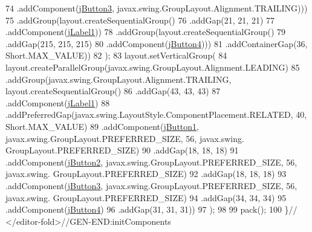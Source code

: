 \begin{DoxyCode}
74                             .addComponent(\mbox{\hyperlink{classinterfacessoguar_1_1encargado_a44f99cceb2a2d736508b0249e1ad447e}{jButton3}}, javax.swing.GroupLayout.Alignment.TRAILING)))
75                     .addGroup(layout.createSequentialGroup()
76                         .addGap(21, 21, 21)
77                         .addComponent(\mbox{\hyperlink{classinterfacessoguar_1_1encargado_a1b1ad6a8d2b52a465c2daf3b4409c9ed}{jLabel1}}))
78                     .addGroup(layout.createSequentialGroup()
79                         .addGap(215, 215, 215)
80                         .addComponent(\mbox{\hyperlink{classinterfacessoguar_1_1encargado_ada21ea49d21b7b6bdd43b2a7c584450d}{jButton4}})))
81                 .addContainerGap(36, Short.MAX\_VALUE))
82         );
83         layout.setVerticalGroup(
84             layout.createParallelGroup(javax.swing.GroupLayout.Alignment.LEADING)
85             .addGroup(javax.swing.GroupLayout.Alignment.TRAILING, layout.createSequentialGroup()
86                 .addGap(43, 43, 43)
87                 .addComponent(\mbox{\hyperlink{classinterfacessoguar_1_1encargado_a1b1ad6a8d2b52a465c2daf3b4409c9ed}{jLabel1}})
88                 .addPreferredGap(javax.swing.LayoutStyle.ComponentPlacement.RELATED, 40, Short.MAX\_VALUE)
89                 .addComponent(\mbox{\hyperlink{classinterfacessoguar_1_1encargado_a5c4a8d1db3281eae3c5b8f19262b20c3}{jButton1}}, javax.swing.GroupLayout.PREFERRED\_SIZE, 56, javax.swing.
      GroupLayout.PREFERRED\_SIZE)
90                 .addGap(18, 18, 18)
91                 .addComponent(\mbox{\hyperlink{classinterfacessoguar_1_1encargado_a1f39888fb096cb2dd2e874f7e05f05b5}{jButton2}}, javax.swing.GroupLayout.PREFERRED\_SIZE, 56, javax.swing.
      GroupLayout.PREFERRED\_SIZE)
92                 .addGap(18, 18, 18)
93                 .addComponent(\mbox{\hyperlink{classinterfacessoguar_1_1encargado_a44f99cceb2a2d736508b0249e1ad447e}{jButton3}}, javax.swing.GroupLayout.PREFERRED\_SIZE, 56, javax.swing.
      GroupLayout.PREFERRED\_SIZE)
94                 .addGap(34, 34, 34)
95                 .addComponent(\mbox{\hyperlink{classinterfacessoguar_1_1encargado_ada21ea49d21b7b6bdd43b2a7c584450d}{jButton4}})
96                 .addGap(31, 31, 31))
97         );
98 
99         pack();
100     \}\textcolor{comment}{// </editor-fold>//GEN-END:initComponents}
\end{DoxyCode}
\mbox{\label{classinterfacessoguar_1_1encargado_a4a03ba85f374b1b38e4f5c2ca80aa0cc}} 
